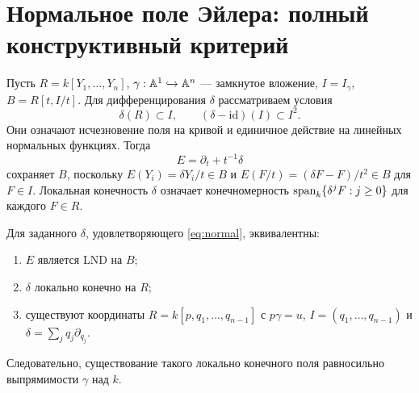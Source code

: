 \section{Нормальное поле Эйлера: полный конструктивный критерий}
Пусть $R=k[Y_1,\ldots,Y_n]$, $\gamma:{\mathbb{A}}^1\hookrightarrow{\mathbb{A}}^n$ --- замкнутое вложение,
$I=I_\gamma$, $B=R[t,I/t]$. Для дифференцирования $\delta$ рассматриваем
условия
\begin{equation}\label{eq:normal}
\delta(R)\subset I,\qquad (\delta-\mathrm{id})(I)\subset I^2.
\end{equation}
Они означают исчезновение поля на кривой и единичное действие на
линейных нормальных функциях. Тогда
\[
E=\partial_t+t^{-1}\delta
\]
сохраняет $B$, поскольку $E(Y_i)=\delta Y_i/t\in B$ и
$E(F/t)=(\delta F-F)/t^2\in B$ для $F\in I$.
Локальная конечность $\delta$ означает конечномерность
$\operatorname{span}_k\{\delta^jF:j\ge0\}$ для каждого $F\in R$.

\begin{theorem}\label{thm:euler}
Для заданного $\delta$, удовлетворяющего \eqref{eq:normal}, эквивалентны:
\begin{enumerate}
\item $E$ является LND на $B$;
\item $\delta$ локально конечно на $R$;
\item существуют координаты $R=k[p,q_1,\ldots,q_{n-1}]$ с
$p\gamma=u$, $I=(q_1,\ldots,q_{n-1})$ и
$\delta=\sum_jq_j\partial_{q_j}$.
\end{enumerate}
Следовательно, существование такого локально конечного поля
равносильно выпрямимости $\gamma$ над $k$.
\end{theorem}

